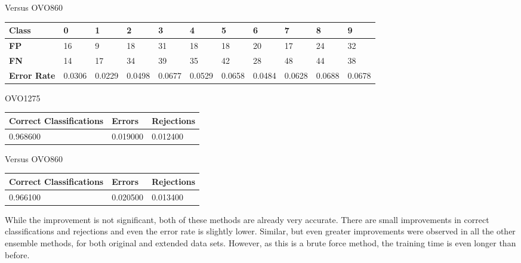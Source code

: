 \documentclass[
  a4paper,            %
  DIV=10,             %
  oneside,            %
  BCOR=5mm,           %
  parskip=half,       %
  numbers=noenddot,   %
  bibtotoc,           %
  listof=totoc,        %
  article
]{scrreprt}
\begin{document}
\begin{center}
  Versus OVO860
\end{center}

\begin{center}
  \begin{tabular}{|p{1cm}|p{1cm}|p{1cm}|p{1cm}|p{1cm}|p{1cm}|p{1cm}|p{1cm}|p{1cm}|p{1cm}|p{1cm}|}
    \hline
    \textbf{Class} & \textbf{0} & \textbf{1} & \textbf{2} & \textbf{3} & \textbf{4} & \textbf{5} & \textbf{6} & \textbf{7} & \textbf{8} & \textbf{9} \\
    \hline
    \textbf{FP} & 16 & 9 & 18 & 31 & 18 & 18 & 20 & 17 & 24 & 32 \\
    \hline
    \textbf{FN} & 14 & 17 & 34 & 39 & 35 & 42 & 28 & 48 & 44 & 38 \\
    \hline
    \textbf{Error Rate} & 0.0306 & 0.0229 & 0.0498 & 0.0677 & 0.0529 & 0.0658 & 0.0484 & 0.0628 & 0.0688 & 0.0678 \\
    \hline
  \end{tabular}
\end{center}

\begin{center}
  OVO1275
\end{center}

\begin{center}
  \begin{tabular}{|p{5cm}|p{3cm}|p{3cm}|}
    \hline
    \textbf{Correct Classifications} & \textbf{Errors} & \textbf{Rejections} \\
    \hline
    0.968600 & 0.019000 & 0.012400 \\
    \hline
  \end{tabular}
\end{center}

\begin{center}
  Versus OVO860
\end{center}

\begin{center}
  \begin{tabular}{|p{5cm}|p{3cm}|p{3cm}|}
    \hline
    \textbf{Correct Classifications} & \textbf{Errors} & \textbf{Rejections} \\
    \hline
    0.966100 & 0.020500 & 0.013400 \\
    \hline
  \end{tabular}
\end{center}
While the improvement is not significant, both of these methods are already very accurate.
There are small improvements in correct classifications and rejections and even the error rate is slightly lower.
Similar, but even greater improvements were observed in all the other ensemble methods, for both original and extended data sets.
However, as this is a brute force method, the training time is even longer than before.
\end{document}
